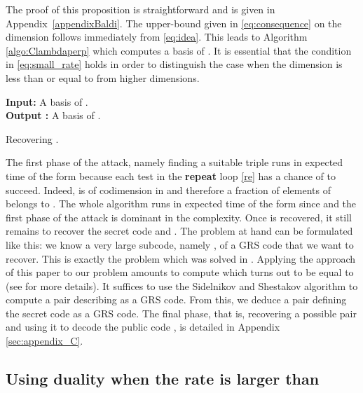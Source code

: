 \documentclass[runningheads,11pt]{llncs}
\begin{document}
The proof of this proposition is straightforward and is given in Appendix~\ref{appendixBaldi}. The upper-bound 
given in \eqref{eq:consequence} on the dimension
follows immediately from \eqref{eq:idea}. This leads to Algorithm \ref{algo:Clambdaperp} which computes
a basis of . It is essential that the condition
in \eqref{eq:small_rate} holds in order to distinguish the case when the 
dimension is less than or equal to  from higher dimensions.
\begin{algorithm}[h]
  {\bf Input: } A basis  of .\\
  {\bf Output : } A basis  of .

  \begin{algorithmic}[1]
  \REPEAT \label{re}
   \FOR{}
   \ENDFOR
   \STATE{ }
  \STATE{}
  \STATE{}
  \WHILE{}
    \REPEAT
  \STATE{}
\UNTIL{ \AND }
  \STATE{}
  \STATE{}
  \ENDWHILE
    \RETURN{;}
  \end{algorithmic}
  \caption{\label{algo:Clambdaperp}Recovering .}
\end{algorithm}

The first phase of the attack, namely finding a suitable triple  runs 
in expected time of the form  because 
each test in the \textbf{repeat} loop \ref{re} has a chance of
 to succeed. Indeed, 
 is of codimension  in  and therefore
a fraction  of elements of  belongs to .
The whole algorithm runs in expected time of the form 
 since
 and the first phase of the attack  
is dominant in the complexity. Once  is
recovered, it still remains to recover the secret code and . 
The problem at hand can be formulated like this: we know a very large subcode,
namely ,
of a GRS code that we want to recover. This is exactly the problem which was solved in \cite{Wie10}. Applying the approach of this paper to our 
problem amounts to compute   which turns out to be 
equal to  (see \cite{MMP11a} for more details). 
It suffices to use the Sidelnikov and Shestakov algorithm
\cite{SidelShesta92} to compute a 
pair  describing 
as a GRS code.  From this, we deduce a pair  defining 
the secret code  as a GRS code. The final phase, that is, recovering a possible
 pair and using it to decode the public code , is detailed in Appendix \ref{sec:appendix_C}.





\subsection{Using duality when the rate is larger than }
\end{document}

